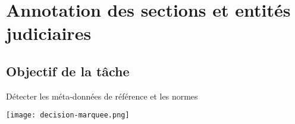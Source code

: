 \section{Annotation des sections et entités judiciaires}

\subsection{Objectif de la tâche}
\begin{frame}[t]{\mysubsectiontitle}
	Détecter les méta-données de référence et les normes

\begin{center}
	\texttt{[image: decision-marquee.png]}
\end{center}

\end{frame}


